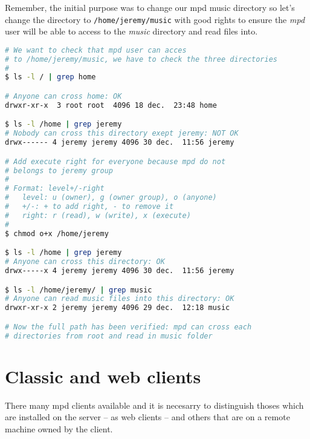 Remember, the initial purpose was to change our mpd music directory so let's 
change the directory to \og{}\texttt{/home/jeremy/music}\fg{} with good rights 
to ensure the \emph{mpd} user will be able to access to the \emph{music} directory 
and read files into.

\begin{lstlisting}[language=bash,caption=Check rights on path]
# We want to check that mpd user can acces
# to /home/jeremy/music, we have to check the three directories
#
$ ls -l / | grep home

# Anyone can cross home: OK
drwxr-xr-x  3 root root  4096 18 dec.  23:48 home

$ ls -l /home | grep jeremy
# Nobody can cross this directory exept jeremy: NOT OK
drwx------ 4 jeremy jeremy 4096 30 dec.  11:56 jeremy

# Add execute right for everyone because mpd do not 
# belongs to jeremy group
#
# Format: level+/-right
#   level: u (owner), g (owner group), o (anyone)
#   +/-: + to add right, - to remove it
#   right: r (read), w (write), x (execute)
#
$ chmod o+x /home/jeremy

$ ls -l /home | grep jeremy
# Anyone can cross this directory: OK
drwx-----x 4 jeremy jeremy 4096 30 dec.  11:56 jeremy

$ ls -l /home/jeremy/ | grep music
# Anyone can read music files into this directory: OK
drwxr-xr-x 2 jeremy jeremy 4096 29 dec.  12:18 music

# Now the full path has been verified: mpd can cross each
# directories from root and read in music folder
\end{lstlisting}

\section{Classic and web clients}

There many mpd clients available and it is necesarry to distinguish thoses which 
are installed on the server -- as web clients -- and others that are on a remote 
machine owned by the client.

